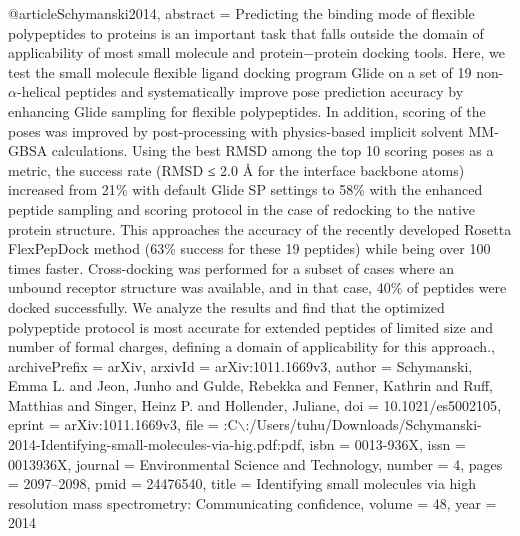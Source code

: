 @article{Schymanski2014,
abstract = {Predicting the binding mode of flexible polypeptides to proteins is an important task that falls outside the domain of applicability of most small molecule and protein−protein docking tools. Here, we test the small molecule flexible ligand docking program Glide on a set of 19 non-$\alpha$-helical peptides and systematically improve pose prediction accuracy by enhancing Glide sampling for flexible polypeptides. In addition, scoring of the poses was improved by post-processing with physics-based implicit solvent MM- GBSA calculations. Using the best RMSD among the top 10 scoring poses as a metric, the success rate (RMSD ≤ 2.0 {\AA} for the interface backbone atoms) increased from 21{\%} with default Glide SP settings to 58{\%} with the enhanced peptide sampling and scoring protocol in the case of redocking to the native protein structure. This approaches the accuracy of the recently developed Rosetta FlexPepDock method (63{\%} success for these 19 peptides) while being over 100 times faster. Cross-docking was performed for a subset of cases where an unbound receptor structure was available, and in that case, 40{\%} of peptides were docked successfully. We analyze the results and find that the optimized polypeptide protocol is most accurate for extended peptides of limited size and number of formal charges, defining a domain of applicability for this approach.},
archivePrefix = {arXiv},
arxivId = {arXiv:1011.1669v3},
author = {Schymanski, Emma L. and Jeon, Junho and Gulde, Rebekka and Fenner, Kathrin and Ruff, Matthias and Singer, Heinz P. and Hollender, Juliane},
doi = {10.1021/es5002105},
eprint = {arXiv:1011.1669v3},
file = {:C$\backslash$:/Users/tuhu/Downloads/Schymanski-2014-Identifying-small-molecules-via-hig.pdf:pdf},
isbn = {0013-936X},
issn = {0013936X},
journal = {Environmental Science and Technology},
number = {4},
pages = {2097--2098},
pmid = {24476540},
title = {{Identifying small molecules via high resolution mass spectrometry: Communicating confidence}},
volume = {48},
year = {2014}
}
